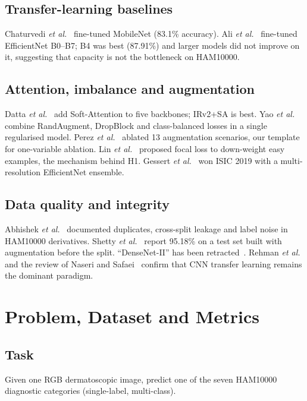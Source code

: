 \documentclass[conference]{IEEEtran}
\begin{document}
\subsection{Transfer-learning baselines}
Chaturvedi \emph{et al.}~\cite{chaturvedi2020} fine-tuned MobileNet (83.1\% accuracy). Ali \emph{et al.}~\cite{ali2021} fine-tuned EfficientNet B0--B7; B4 was best (87.91\%) and larger models did not improve on it, suggesting that capacity is not the bottleneck on HAM10000.

\subsection{Attention, imbalance and augmentation}
Datta \emph{et al.}~\cite{datta2021} add Soft-Attention to five backbones; IRv2+SA is best. Yao \emph{et al.}~\cite{yao2022} combine RandAugment, DropBlock and class-balanced losses in a single regularised model. Perez \emph{et al.}~\cite{perez2018} ablated 13 augmentation scenarios, our template for one-variable ablation. Lin \emph{et al.}~\cite{lin2017focal} proposed focal loss to down-weight easy examples, the mechanism behind H1. Gessert \emph{et al.}~\cite{gessert2020} won ISIC 2019 with a multi-resolution EfficientNet ensemble.

\subsection{Data quality and integrity}
Abhishek \emph{et al.}~\cite{abhishek2025} documented duplicates, cross-split leakage and label noise in HAM10000 derivatives. Shetty \emph{et al.}~\cite{shetty2022} report 95.18\% on a test set built with augmentation before the split. ``DenseNet-II'' has been retracted~\cite{densenet2}. Rehman \emph{et al.}~\cite{rehman2022} and the review of Naseri and Safaei~\cite{naseri2025} confirm that CNN transfer learning remains the dominant paradigm.

\section{Problem, Dataset and Metrics}\label{sec:data}
\subsection{Task}
Given one RGB dermatoscopic image, predict one of the seven HAM10000 diagnostic categories (single-label, multi-class).
\end{document}
